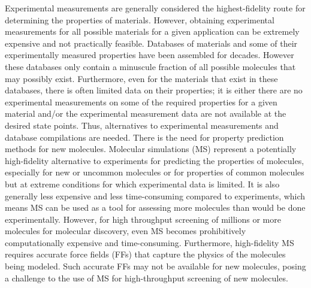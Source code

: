 \documentclass[journal=jacsat,manuscript=article]{achemso}
\begin{document}
Experimental measurements are generally considered the highest-fidelity route for determining the properties of materials. 
However, obtaining experimental measurements for all possible materials for a given application can be extremely expensive and not practically feasible. 
Databases of materials and some of their experimentally measured properties have been assembled for decades. However these databases only contain a minuscule fraction of all possible molecules that may possibly exist. Furthermore, even for the materials that exist in these databases, there is often limited data on their properties; it is either there are no experimental measurements on some of the required properties for a given material and/or the experimental measurement data are not available at the desired state points. Thus, alternatives to experimental measurements and database compilations are needed. There is the need for property prediction methods for new molecules.
Molecular simulations (MS) represent a potentially high-fidelity alternative to experiments for predicting the properties of molecules, especially for new or uncommon molecules or for properties of common molecules but at extreme conditions for which experimental data is limited. It is also generally less expensive and less time-consuming compared to experiments, which means MS can be used as a tool for assessing more molecules than would be done experimentally. However, for high throughput screening of millions or more molecules for molecular discovery, even MS becomes prohibitively computationally expensive and time-consuming. Furthermore, high-fidelity MS requires accurate force fields (FFs) that capture the physics of the molecules being modeled. Such accurate FFs may not be available for new molecules, posing a challenge to the use of MS for high-throughput screening of new molecules.
\end{document}
